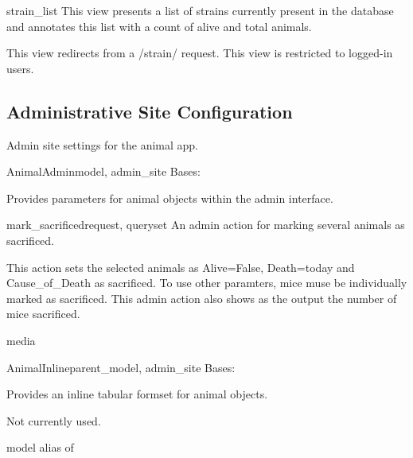 \documentclass[letterpaper,10pt,english]{sphinxmanual}
\begin{document}
\hypertarget{animal.views.strain_list}{}\begin{memberdesc}{strain\_list}
This view presents a list of strains currently present in the database and annotates this list with a count of alive and total animals.

This view redirects from a /strain/ request.
This view is restricted to logged-in users.
\end{memberdesc}
\hypertarget{module-animal.urls}{}
\modulesynopsis{}

\subsection{Administrative Site Configuration}
\hypertarget{module-animal.admin}{}
\modulesynopsis{}
Admin site settings for the animal app.

\hypertarget{animal.admin.AnimalAdmin}{}\begin{classdesc}{AnimalAdmin}{model, admin\_site}
Bases: 

Provides parameters for animal objects within the admin interface.

\hypertarget{animal.admin.AnimalAdmin.mark_sacrificed}{}\begin{methoddesc}{mark\_sacrificed}{request, queryset}
An admin action for marking several animals as sacrificed.

This action sets the selected animals as Alive=False, Death=today and Cause\_of\_Death as sacrificed.  To use other paramters, mice muse be individually marked as sacrificed.
This admin action also shows as the output the number of mice sacrificed.
\end{methoddesc}

\hypertarget{animal.admin.AnimalAdmin.media}{}\begin{memberdesc}{media}\end{memberdesc}
\end{classdesc}

\hypertarget{animal.admin.AnimalInline}{}\begin{classdesc}{AnimalInline}{parent\_model, admin\_site}
Bases: 

Provides an inline tabular formset for animal objects.

Not currently used.

\hypertarget{animal.admin.AnimalInline.model}{}\begin{memberdesc}{model}
alias of 
\end{memberdesc}
\end{classdesc}
\end{document}
